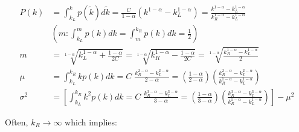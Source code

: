 \documentclass[10pt,letterpaper]{article}
\begin{document}
\begin{align}\label{eq:md}
	P(k) &=\int_{k_L}^k p(\tilde{k})d\tilde{k}=\frac{C}{1-\alpha}(k^{1-\alpha}-k_L^{1-\alpha})=
	\frac{k^{1-\alpha}-k_L^{1-\alpha}}{k_R^{1-\alpha}-k_L^{1-\alpha}}\nonumber\\
	&\left ( m : \int_{k_L}^{m}p(k)dk=\int_{m}^{k_R}p(k)dk=\frac{1}{2} \right )\nonumber\\
	m&=\sqrt[1-\alpha]{k_L^{1-\alpha}+\frac{1-\alpha}{2C}}=
	\sqrt[1-\alpha]{k_R^{1-\alpha}-\frac{1-\alpha}{2C}}=
	\sqrt[1-\alpha]{\frac{k_R^{1-\alpha}-k_L^{1-\alpha}}{2}}\\
	\mu &= \int_{k_L}^{k_R}kp(k)dk=C\;\frac{k_R^{2-\alpha}-k_L^{2-\alpha}}{2-\alpha}=\left(\frac{1-\alpha}{2-\alpha}\right)\left(\frac{k_R^{2-\alpha}-k_L^{2-\alpha}}{k_R^{1-\alpha}-k_L^{1-\alpha}}\right)\nonumber\\
	\sigma^2 &= \left[ \int_{k_L}^{k_R}k^2p(k)dk=C\;\frac{k_R^{3-\alpha}-k_L^{3-\alpha}}{3-\alpha} =\left(\frac{1-\alpha}{3-\alpha}\right)\left(\frac{k_R^{3-\alpha}-k_L^{3-\alpha}}{k_R^{1-\alpha}-k_L^{1-\alpha}}\right) \right] -\mu^2\nonumber
\end{align}

Often, $k_R\rightarrow \infty$ which implies:
\end{document}

